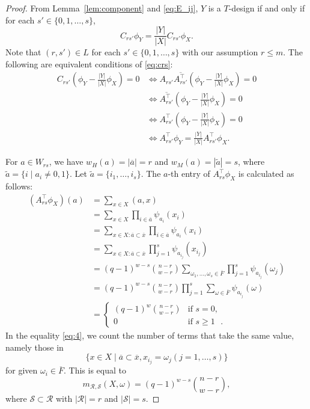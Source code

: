 \documentclass[a4paper, 11pt]{article}
\theoremstyle{definition}
\begin{document}
\begin{proof}
From Lemma~\ref{lem:component} and \eqref{eq:E_ij}, 
$Y$ is a $T$-design if and only if for each $s' \in \{0,1,\ldots,s\}$, 
\begin{equation} \label{eq:crs}
C_{rs'}\phi_Y=\frac{|Y|}{|X|} C_{rs'} \phi_X.     
\end{equation} 
Note that $(r,s') \in L$ for each $s' \in \{0,1,\ldots, s\}$ with our assumption $r\leq m$. 
    The following are equivalent conditions of \eqref{eq:crs}: 
    \begin{align*}
C_{rs'}(\phi_Y-\frac{|Y|}{|X|} \phi_X)=0 
&\Leftrightarrow A_{rs'}\overline{A_{rs'}^\top}(\phi_Y-\frac{|Y|}{|X|} \phi_X) =0\\
& \Leftrightarrow \overline{A_{rs'}^\top}(\phi_Y-\frac{|Y|}{|X|} \phi_X)=0\\
& \Leftrightarrow A_{rs'}^\top(\phi_Y-\frac{|Y|}{|X|} \phi_X)=0
\\
& \Leftrightarrow A_{rs'}^\top\phi_Y=\frac{|Y|}{|X|}A_{rs'}^\top \phi_X. 
    \end{align*}
 
    For $a \in W_{rs}$, we have $w_H(a)=|\overline{a}|=r$ and $w_M(a)=|\tilde{a}|=s$, where $\tilde{a}=\{i \mid a_i\ne 0,1\}$. 
    Let $\tilde{a}=\{i_1,\ldots, i_s\}$. 
    The $a$-th entry of $A_{rs}^\top \phi_X$ is calculated as follows: 
    \begin{align}
    (A_{rs}^\top \phi_X)(a)&=\sum_{x \in X} (a,x) \nonumber \\
    &=\sum_{x \in X} \prod_{i \in \overline{a}} 
    \psi_{a_i}(x_i)  \nonumber \\
    &= \sum_{x \in X: \overline{a} \subset \overline{x} } \prod_{i \in \overline{a}} \psi_{a_i}(x_i) \label{eq:5} \\
    &= \sum_{x \in X: \overline{a} \subset \overline{x} } \prod_{j =1}^s \psi_{a_{i_j}}(x_{i_j})  \nonumber \\
    &=(q-1)^{w-s} \binom{n-r}{w-r}\sum_{\omega_1,\ldots,\omega_s \in \overline{F}} \prod_{j =1}^s \psi_{a_{i_j}}(\omega_j) \label{eq:4} \\
    &= (q-1)^{w-s} \binom{n-r}{w-r} \prod_{j=1}^s \sum_{\omega \in \overline{F}}\psi_{a_{i_j}}(\omega)  \nonumber \\
    &=\begin{cases}
        (q-1)^{w} \binom{n-r}{w-r} &\text{if $s=0$},  \nonumber\\
        0 &\text{if $s\geq 1$ }. 
    \end{cases}
    \end{align} 
In the equality \eqref{eq:4}, we count the number of terms that take the same value, namely those in  
\[
\{ x \in X \mid \overline{a} \subset \overline{x}, x_{i_j} = \omega_j( j =1,\ldots,s) \}
\]
for given $\omega_i \in \overline{F}$. 
This is equal to 
\[
m_{\mathcal{R},\mathcal{S}}(X,\omega)=(q-1)^{w-s} \binom{n-r}{w-r}, 
\]
where $\mathcal{S} \subset \mathcal{R}$ with $|\mathcal{R}|=r$ and $|\mathcal{S}|=s$. 


\end{proof}
\end{document}
